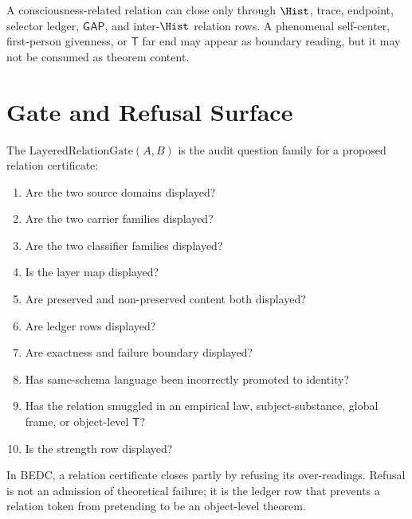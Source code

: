 \begin{principle}
\label{prin:layered-relation-no-subject-substance}
A consciousness-related relation can close only through $\Hist$, trace, endpoint, selector ledger, $\mathsf{GAP}$, and inter-$\Hist$ relation rows. A phenomenal self-center, first-person givenness, or $\mathsf{T}$ far end may appear as boundary reading, but it may not be consumed as theorem content.
\end{principle}

\section{Gate and Refusal Surface}
\label{sec:layered-relation-gate-refusal}

\begin{definition}
\label{def:layered-relation-gate}
The $\mathrm{LayeredRelationGate}(A,B)$ is the audit question family for a proposed relation certificate:
\begin{enumerate}
\item Are the two source domains displayed?
\item Are the two carrier families displayed?
\item Are the two classifier families displayed?
\item Is the layer map displayed?
\item Are preserved and non-preserved content both displayed?
\item Are ledger rows displayed?
\item Are exactness and failure boundary displayed?
\item Has same-schema language been incorrectly promoted to identity?
\item Has the relation smuggled in an empirical law, subject-substance, global frame, or object-level $\mathsf{T}$?
\item Is the strength row displayed?
\end{enumerate}
\end{definition}

\begin{principle}
\label{prin:layered-relation-refusal-is-closure}
In BEDC, a relation certificate closes partly by refusing its over-readings. Refusal is not an admission of theoretical failure; it is the ledger row that prevents a relation token from pretending to be an object-level theorem.
\end{principle}

